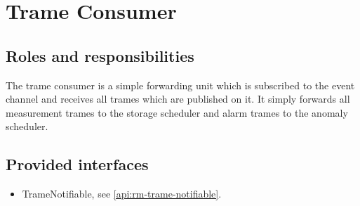 \section{Trame Consumer}
\label{element:rm-trame-consumer}

\subsection{Roles and responsibilities}

\npar The trame consumer is a simple forwarding unit which is subscribed to the
event channel and receives all trames which are published on it. It simply
forwards all measurement trames to the storage scheduler and alarm trames to the
anomaly scheduler.

\subsection{Provided interfaces}

\begin{itemize}
  \item TrameNotifiable, see \ref{api:rm-trame-notifiable}.
\end{itemize}

